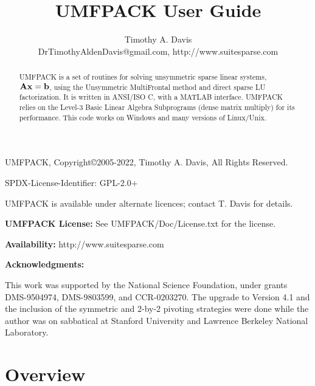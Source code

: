 \documentclass[11pt]{article}
\newcommand{\m}[1]{{\bf{#1}}}       %
\begin{document}
\author{Timothy A. Davis \\
DrTimothyAldenDavis@gmail.com, http://www.suitesparse.com}
\title{UMFPACK User Guide}

\maketitle

\begin{abstract}
    UMFPACK is a set of routines for solving unsymmetric sparse linear
    systems, $\m{Ax}=\m{b}$, using the Unsymmetric MultiFrontal method
    and direct sparse LU factorization.  It is written in ANSI/ISO C, with a
    MATLAB interface.  UMFPACK relies on the Level-3 Basic
    Linear Algebra Subprograms (dense matrix multiply) for its performance.
    This code works on Windows and many versions of Linux/Unix.
\end{abstract}

UMFPACK, Copyright\copyright 2005-2022, Timothy A. Davis, All Rights Reserved.

SPDX-License-Identifier: GPL-2.0+

UMFPACK is available under alternate licences; contact T. Davis for details.

{\bf UMFPACK License:} See UMFPACK/Doc/License.txt for the license.

{\bf Availability:}
    http://www.suitesparse.com

{\bf Acknowledgments:}

    This work was supported by the National Science Foundation, under
    grants DMS-9504974, DMS-9803599, and CCR-0203270.
    The upgrade to Version 4.1 and the inclusion of the
    symmetric and 2-by-2 pivoting strategies
    were done while the author was on sabbatical at
    Stanford University and Lawrence Berkeley National Laboratory.

\newpage

\tableofcontents

\newpage
\section{Overview}
\end{document}
